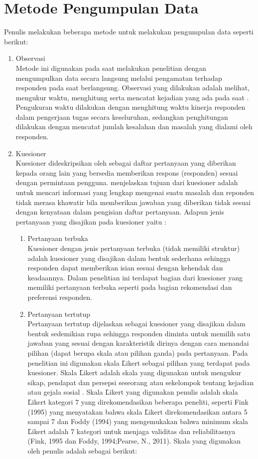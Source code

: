 \section{Metode Pengumpulan Data}
Penulis melakukan beberapa metode untuk melakukan pengumpulan data seperti berikut:
\begin{enumerate}
	\item Observasi\\
	Metode ini digunakan pada saat melakukan penelitian dengan mengumpulkan data secara langsung melalui pengamatan terhadap responden pada saat \ust \space berlangsung. Observasi yang dilakukan adalah melihat, mengukur waktu, menghitung serta mencatat kejadian yang ada pada saat \ust. Pengukuran waktu dilakukan dengan menghitung waktu kinerja responden dalam pengerjaan tugas secara keseluruhan, sedangkan penghitungan dilakukan dengan mencatat jumlah kesalahan dan masalah yang dialami oleh responden.
	\item Kuesioner\\
	Kuesioner dideskripsikan oleh \citet{buku.riduwan} sebagai daftar pertanyaan yang diberikan kepada orang lain yang bersedia memberikan respons (responden) sesuai dengan permintaan pengguna. \citeauthor{buku.riduwan} menjelaskan tujuan dari kuesioner adalah untuk mencari informasi yang lengkap mengenai suatu masalah dan reponden tidak merasa khawatir bila memberikan jawaban yang diberikan tidak sesuai dengan kenyataan dalam pengisian daftar pertanyaan.
	Adapun jenis pertanyaan yang disajikan pada kuesioner yaitu \citep{buku.riduwan}:
	\begin{enumerate}
		\item Pertanyaan terbuka\\
		Kuesioner dengan jenis pertanyaan terbuka (tidak memiliki struktur) adalah kuesioner yang disajikan dalam bentuk sederhana sehingga responden dapat memberikan isian sesuai dengan kehendak dan keadaannya. Dalam penelitian ini terdapat bagian dari kuesioner yang memiliki pertanyaan terbuka seperti pada bagian rekomendasi dan preferensi responden.
		\item Pertanyaan tertutup\\
		Pertanyaan tertutup dijelaskan sebagai kuesioner yang disajikan dalam bentuk sedemikian rupa sehingga responden diminta untuk memilih satu jawaban yang sesuai dengan karakteristik dirinya dengan cara menandai pilihan (dapat berupa skala atau pilihan ganda) pada pertanyaan. Pada penelitian ini digunakan skala \f{Likert} sebagai pilihan yang terdapat pada kuesioner. Skala \f{Likert} adalah skala yang digunakan untuk mengukur sikap, pendapat dan persepsi seseorang atau sekelompok tentang kejadian atau gejala sosial \citep{buku.riduwan}. Skala \f{Likert} yang digunakan penulis adalah skala \f{Likert} kategori 7 yang direkomendasikan beberapa peneliti, seperti Fink (1995) yang menyatakan bahwa skala \f{Likert} direkomendasikan antara 5 sampai 7 dan Foddy (1994) yang mengemukakan bahwa minimum skala \f{Likert} adalah 7 kategori untuk menjaga validitas dan reliabilitasnya (Fink, 1995 dan Foddy, 1994;Pearse, N., 2011). Skala yang digunakan oleh penulis adalah sebagai berikut:

\end{enumerate}
\end{enumerate}
